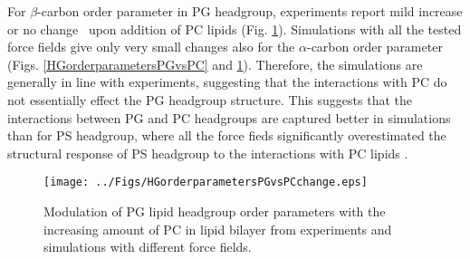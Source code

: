 \documentclass[aps,prl,superscriptaddress,twocolumn]{revtex4}
\begin{document}
For $\beta$-carbon order parameter in PG headgroup, experiments report
mild increase \cite{macdonald87} or no change~\cite{borle85} upon addition 
of PC lipids (Fig. \ref{HGorderparametersPGvsPCchange}). 
Simulations with all the tested force fields give only very small changes also for
the $\alpha$-carbon order parameter (Figs. \ref{HGorderparametersPGvsPC} and \ref{HGorderparametersPGvsPCchange}). 
Therefore, the simulations are generally in line with experiments, suggesting that the
interactions with PC do not essentially effect the PG headgroup structure.
This suggests that the interactions between PG and PC headgroups are captured better in
simulations than for PS headgroup, where
all the force fieds significantly overestimated the structural response of PS headgroup
to the interactions with PC lipids \cite{antila18}.
\begin{figure}[]
  \centering
  \texttt{[image: ../Figs/HGorderparametersPGvsPCchange.eps]}
  \caption{\label{HGorderparametersPGvsPCchange}
    Modulation of PG lipid headgroup order parameters with the increasing amount of PC in lipid bilayer
    from experiments \cite{borle85,macdonald87} and simulations with different force fields.
  }
\end{figure}




\clearpage
\end{document}
